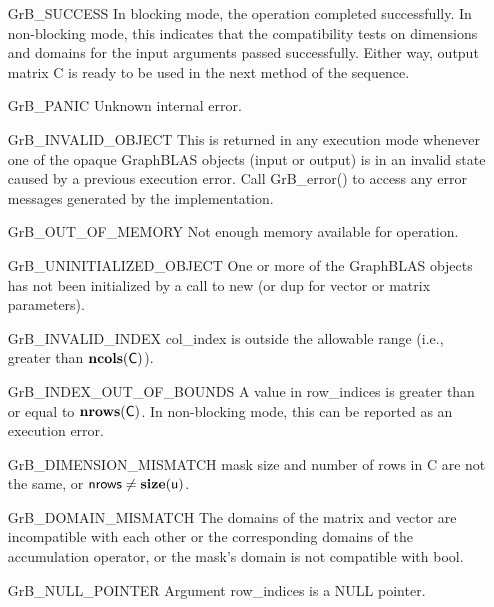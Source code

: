 \begin{itemize}[leftmargin=2.1in]
    \item[{\sf GrB\_SUCCESS}]         In blocking mode, the operation completed
    successfully. In non-blocking mode, this indicates that the compatibility 
    tests on dimensions and domains for the input arguments passed successfully. 
    Either way, output matrix {\sf C} is ready to be used in the next method of 
    the sequence.

    \item[{\sf GrB\_PANIC}]            Unknown internal error.
    
    \item[{\sf GrB\_INVALID\_OBJECT}] This is returned in any execution mode 
    whenever one of the opaque GraphBLAS objects (input or output) is in an invalid 
    state caused by a previous execution error.  Call {\sf GrB\_error()} to access 
    any error messages generated by the implementation.

    \item[{\sf GrB\_OUT\_OF\_MEMORY}]  Not enough memory available for operation.
    
    \item[{\sf GrB\_UNINITIALIZED\_OBJECT}] One or more of the GraphBLAS objects
    has not been initialized by a call to {\sf new} (or {\sf dup} for vector or
    matrix parameters).

    \item[{\sf GrB\_INVALID\_INDEX}]    {\sf col\_index} is outside the allowable 
    range (i.e., greater than $\bold{ncols}({\sf C})$).

    \item[{\sf GrB\_INDEX\_OUT\_OF\_BOUNDS}]  A value in {\sf row\_indices} 
    is greater than or equal to $\bold{nrows}({\sf C})$.  In 
    non-blocking mode, this can be reported as an execution error.
    
    \item[{\sf GrB\_DIMENSION\_MISMATCH}] {\sf mask} size and number of rows
    in {\sf C} are not the same, or ${\sf nrows} \neq \bold{size}({\sf u})$.

    \item[{\sf GrB\_DOMAIN\_MISMATCH}]     The domains of the matrix and vector
    are incompatible with each other or the corresponding domains of the 
    accumulation operator, or the mask's domain is not compatible with {\sf bool}.

    \item[{\sf GrB\_NULL\_POINTER}] Argument {\sf row\_indices} is a {\sf NULL} pointer.
\end{itemize}

